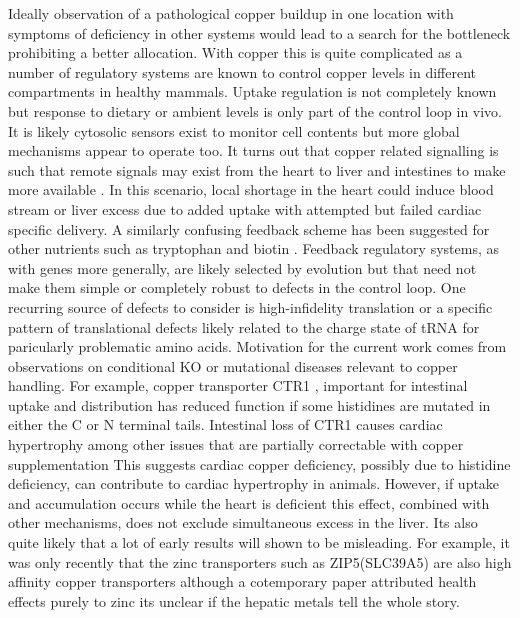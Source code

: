 {Ideally observation of a pathological copper 
buildup in one location with symptoms of deficiency
in other systems would lead to a search for 
the bottleneck prohibiting a better allocation.
With copper this is quite complicated as 
a number of regulatory systems are known to control
copper levels in different compartments  in healthy mammals.
Uptake regulation is not completely known but response to
dietary or ambient levels is only part of the control
loop in vivo. It is  likely cytosolic sensors exist \cite{PMC6365104}
to monitor cell contents but more global mechanisms appear to 
operate too.
It turns out that copper related signalling is such that remote 
signals may exist from the heart
to liver and intestines to make more available
\cite{Kim_Turski_Nose_Cardiac_Copper_Deficiency_Activates_2010}
\cite{xxx_Mechanism_regulation_2010}. In this scenario, local
shortage in the heart could induce blood stream or liver excess 
due to added
uptake with attempted but failed   cardiac specific delivery.
A similarly confusing  feedback scheme 
has been suggested for other nutrients such as tryptophan
\cite{mmarchywka-MJM-2021-007-.1-table-rg}
and biotin
\cite{marchywka-MJM-2022-010-0.80}
\cite{marchywka-MJM-2021-015-0.50-rg}
.  Feedback  regulatory systems, as with genes more generally,  are likely 
selected by evolution but that need not make them simple
or  completely robust to defects in the control loop.
One recurring source of defects to consider is  high-infidelity
translation or a specific pattern of translational defects likely related
to the charge state of tRNA for paricularly problematic
amino acids.   
Motivation for the current work comes from observations on
conditional KO or mutational diseases relevant to copper handling. 
For example, copper transporter CTR1 , important for
intestinal uptake  
\cite{Nose_Kim_Thiele_Ctr1_drives_intestinal_copper_2006}
and distribution  
\cite{Lee_Prohaska_Thiele_Essential_role_mammalian_2001}
\cite{PMC9759326}
\cite{PMC34439}
has  reduced function  if some
histidines are mutated in either the C or N terminal tails. 
Intestinal loss of CTR1 causes cardiac hypertrophy
among other issues that are partially correctable with copper supplementation
\cite{Nose_Kim_Thiele_Ctr1_drives_intestinal_copper_2006}
This suggests cardiac copper deficiency, possibly due to histidine 
deficiency,  can contribute to  cardiac hypertrophy 
in animals.  However, if uptake and accumulation occurs
while the heart is deficient this effect,  combined
with other mechanisms,   does not exclude simultaneous excess in the liver.
Its also quite likely that a lot of early results will shown
to be misleading. For example, it was only recently that the
zinc transporters such as ZIP5(SLC39A5) are also high affinity
copper transporters
\cite{Polesel2023}
although a cotemporary paper attributed health effects purely to 
zinc \cite{Chim_2023} its unclear if the hepatic metals tell
the whole story.

}
